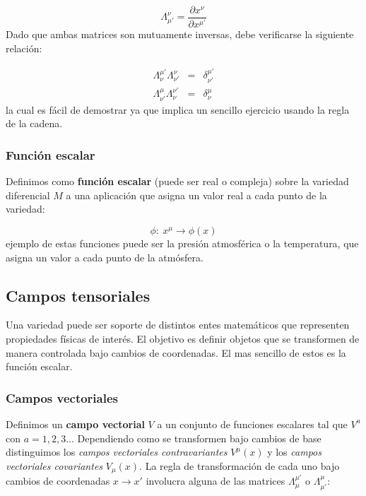 \documentclass[12pt,a4paper]{book}
\numberwithin{equation}{section}
\numberwithin{figure}{section}
\newcommand{\parciales}[2]{\frac{\partial #1}{\partial #2}}
\begin{document}
\begin{equation}
\Lambda_{\mu'}^{\nu} = \parciales{x^{\nu}}{x^{\mu'}} 
\end{equation}
Dado que ambas matrices son mutuamente inversas, debe verificarse la siguiente relación:

\begin{eqnarray}
\Lambda^{\mu'}_{\nu} \Lambda^{\nu}_{\nu'} & = & \delta^{\mu'}_{\nu'}  \\
\Lambda^{\mu}_{\nu'} \Lambda^{\nu'}_{\nu} & = & \delta^{\mu}_{\nu}  
\end{eqnarray}
la cual es fácil de demostrar ya que implica un sencillo ejercicio usando la regla de la cadena. 

\subsubsection{Función escalar}

Definimos como \textbf{función escalar} (puede ser real o compleja) sobre la variedad diferencial $M$ a una aplicación que asigna un valor real a cada punto de la variedad:

\begin{equation}
\phi : \ x^{\mu} \rightarrow \phi(x)
\end{equation} 
ejemplo de estas funciones puede ser la presión atmosférica o la temperatura, que asigna un valor a cada punto de la atmósfera.  \\


\subsection{Campos tensoriales}

Una variedad puede ser soporte de distintos entes matemáticos que representen propiedades físicas de interés. El objetivo es definir objetos que se transformen de manera controlada bajo cambios de coordenadas. El mas sencillo de estos es la función escalar. 

\subsubsection{Campos vectoriales}

Definimos un \textbf{campo vectorial} $V$ a un conjunto de funciones escalares tal que $V^a$ con $a=1,2,3...$ Dependiendo como se transformen bajo cambios de base distinguimos los \textit{campos vectoriales contravariantes} $V^{\mu}(x)$ y los \textit{campos vectoriales covariantes} $V_{\mu}(x)$. La regla de transformación de cada uno bajo cambios de coordenadas $x\rightarrow x'$ involucra alguna de las matrices $\Lambda^{\mu'}_{\mu}$ o $\Lambda^{\mu}_{\mu'}$:
\end{document}
